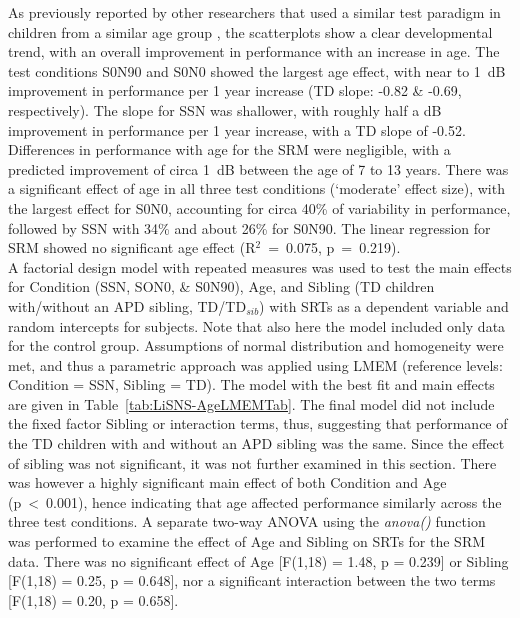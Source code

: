 \documentclass[a4paper, twoside]{templates/ociamthesis}
\begin{document}
As previously reported by other researchers that used a similar test paradigm in children from a similar age group \autocites[e.g.,][]{Cameron2007,Murphy2019}, the scatterplots show a clear developmental trend, with an overall improvement in performance with an increase in age. The test conditions S0N90 and S0N0 showed the largest age effect, with near to 1~dB improvement in performance per 1 year increase (TD slope: -0.82 \& -0.69, respectively). The slope for SSN was shallower, with roughly half a dB improvement in performance per 1 year increase, with a TD slope of -0.52. Differences in performance with age for the SRM were negligible, with a predicted improvement of circa 1~dB between the age of 7 to 13 years. There was a significant effect of age in all three test conditions (`moderate' effect size), with the largest effect for S0N0, accounting for circa 40\% of variability in performance, followed by SSN with 34\% and about 26\% for S0N90. The linear regression for SRM showed no significant age effect (R\(^{2}\)~=~0.075, p~=~0.219).\\

A factorial design model with repeated measures was used to test the main effects for Condition (SSN, SON0, \& S0N90), Age, and Sibling (TD children with/without an APD sibling, TD/TD\(_{sib}\)) with SRTs as a dependent variable and random intercepts for subjects. Note that also here the model included only data for the control group. Assumptions of normal distribution and homogeneity were met, and thus a parametric approach was applied using LMEM (reference levels: Condition = SSN, Sibling = TD). The model with the best fit and main effects are given in Table~\ref{tab:LiSNS-AgeLMEMTab}. The final model did not include the fixed factor Sibling or interaction terms, thus, suggesting that performance of the TD children with and without an APD sibling was the same. Since the effect of sibling was not significant, it was not further examined in this section. There was however a highly significant main effect of both Condition and Age (p~\textless~0.001), hence indicating that age affected performance similarly across the three test conditions. A separate two-way ANOVA using the \emph{anova()} function was performed to examine the effect of Age and Sibling on SRTs for the SRM data. There was no significant effect of Age {[}F(1,18) = 1.48, p = 0.239{]} or Sibling {[}F(1,18) = 0.25, p = 0.648{]}, nor a significant interaction between the two terms {[}F(1,18) = 0.20, p = 0.658{]}.\\
\end{document}
